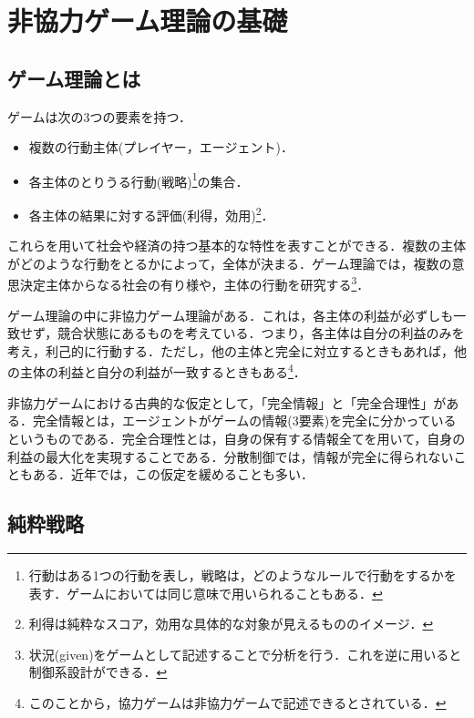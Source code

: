\documentclass{jsreport}
\begin{document}
\chapter{非協力ゲーム理論の基礎}
\section{ゲーム理論とは}
ゲームは次の3つの要素を持つ．
\begin{itemize}
  \item 複数の行動主体(プレイヤー，エージェント)．
  \item 各主体のとりうる行動(戦略)\footnote{行動はある1つの行動を表し，戦略は，どのようなルールで行動をするかを表す．ゲームにおいては同じ意味で用いられることもある．}の集合．
  \item 各主体の結果に対する評価(利得，効用)\footnote{利得は純粋なスコア，効用な具体的な対象が見えるもののイメージ．}．
\end{itemize}

これらを用いて社会や経済の持つ基本的な特性を表すことができる．複数の主体がどのような行動をとるかによって，全体が決まる．ゲーム理論では，複数の意思決定主体からなる社会の有り様や，主体の行動を研究する\footnote{状況(given)をゲームとして記述することで分析を行う．これを逆に用いると制御系設計ができる．}．

ゲーム理論の中に非協力ゲーム理論がある．これは，各主体の利益が必ずしも一致せず，競合状態にあるものを考えている．つまり，各主体は自分の利益のみを考え，利己的に行動する．ただし，他の主体と完全に対立するときもあれば，他の主体の利益と自分の利益が一致するときもある\footnote{このことから，協力ゲームは非協力ゲームで記述できるとされている．}．

非協力ゲームにおける古典的な仮定として，「完全情報」と「完全合理性」がある．完全情報とは，エージェントがゲームの情報(3要素)を完全に分かっているというものである．完全合理性とは，自身の保有する情報全てを用いて，自身の利益の最大化を実現することである．分散制御では，情報が完全に得られないこともある．近年では，この仮定を緩めることも多い．

\section{純粋戦略}
\end{document}
